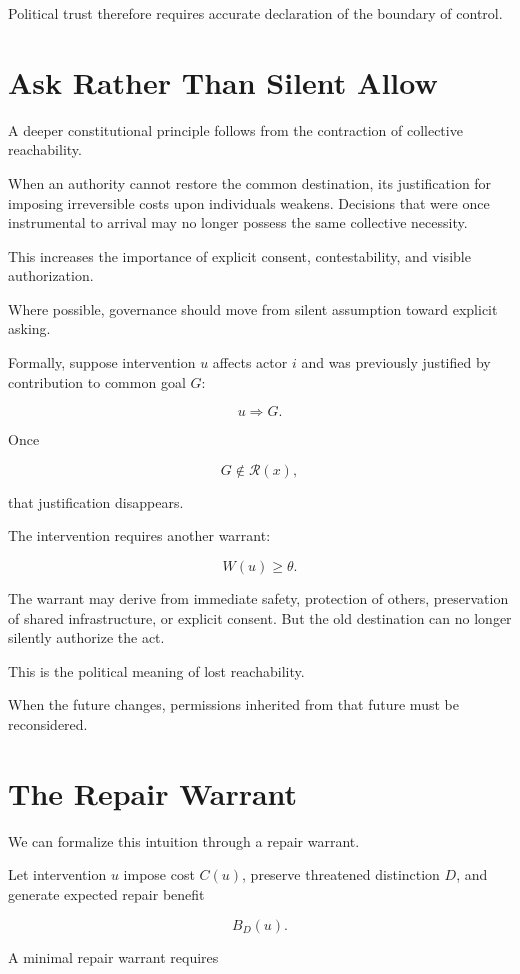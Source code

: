 \documentclass[11pt,oneside]{book}
\theoremstyle{definition}
\theoremstyle{remark}
\newcommand{\R}{\mathcal{R}}
\begin{document}
Political trust therefore requires accurate declaration of the boundary of control.

\section{Ask Rather Than Silent Allow}

A deeper constitutional principle follows from the contraction of collective reachability.

When an authority cannot restore the common destination, its justification for imposing irreversible costs upon individuals weakens. Decisions that were once instrumental to arrival may no longer possess the same collective necessity.

This increases the importance of explicit consent, contestability, and visible authorization.

Where possible, governance should move from silent assumption toward explicit asking.

Formally, suppose intervention \(u\) affects actor \(i\) and was previously justified by contribution to common goal \(G\):

\[
u
\Rightarrow
G.
\]

Once

\[
G\notin\R(x),
\]

that justification disappears.

The intervention requires another warrant:

\[
W(u)\geq\theta.
\]

The warrant may derive from immediate safety, protection of others, preservation of shared infrastructure, or explicit consent. But the old destination can no longer silently authorize the act.

This is the political meaning of lost reachability.

When the future changes, permissions inherited from that future must be reconsidered.

\section{The Repair Warrant}

We can formalize this intuition through a repair warrant.

Let intervention \(u\) impose cost \(C(u)\), preserve threatened distinction \(D\), and generate expected repair benefit

\[
B_D(u).
\]

A minimal repair warrant requires
\end{document}

